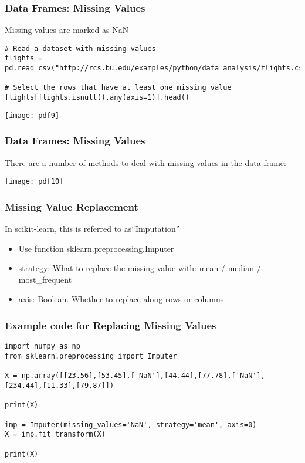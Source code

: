 \begin{frame}[fragile]
\frametitle{Data Frames: Missing Values}
Missing values are marked as NaN

\begin{lstlisting}
# Read a dataset with missing values
flights = pd.read_csv("http://rcs.bu.edu/examples/python/data_analysis/flights.csv")

# Select the rows that have at least one missing value
flights[flights.isnull().any(axis=1)].head()
\end{lstlisting}
\begin{center}
\texttt{[image: pdf9]}
\end{center}
\end{frame}

\begin{frame}[fragile]
\frametitle{Data Frames: Missing Values}
There are a number of methods to deal with missing values in the data frame:
\begin{center}
\texttt{[image: pdf10]}
\end{center}
\end{frame}


\begin{frame}[fragile]\frametitle{Missing Value Replacement}
In scikit-learn, this is referred to as``Imputation''
	\begin{itemize}
	\item Use function sklearn.preprocessing.Imputer
	\item  strategy: What to replace the missing value with: mean / median / most\_frequent
	\item axis: Boolean. Whether to replace along rows or columns
	\end{itemize}
\end{frame}

\begin{frame}[fragile]\frametitle{Example code for Replacing Missing Values}
\begin{lstlisting}
import numpy as np
from sklearn.preprocessing import Imputer

X = np.array([[23.56],[53.45],['NaN'],[44.44],[77.78],['NaN'],[234.44],[11.33],[79.87]])

print(X)

imp = Imputer(missing_values='NaN', strategy='mean', axis=0)
X = imp.fit_transform(X)

print(X)
\end{lstlisting}
\end{frame}

